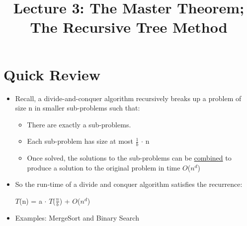 \documentclass[12pt]{article}
\title{\huge Lecture 3: The Master Theorem; The Recursive Tree Method}
\author{}
\date{}
\begin{document}
\maketitle
\section{Quick Review}
\renewcommand{\labelitemii}{$\circ$}
\renewcommand{\labelitemiii}{$\cdot$}
\renewcommand{\labelitemiii}{$\rightarrow$}
\begin{itemize}
\item Recall, a divide-and-conquer algorithm recursively breaks up a problem of size n in smaller sub-problems such that:
	\begin{itemize}
	\item There are exactly a sub-problems.
	\item Each sub-problem has size at most $\frac{1}{b}$ $\cdot$ n
	\item Once solved, the solutions to the sub-problems can be \underline{combined} to produce 	a solution to the original problem in time $O$($n^d$)
	\end{itemize}
\item So the run-time of a divide and conquer algorithm satisfies the recurrence:

\hspace*{\fill}\large{$T$(n) = a $\cdot$ $T$($\frac{n}{b}$) + $O$($n^d$)} \hspace*{\fill} 

\item Examples: MergeSort and Binary Search
\end{itemize}
\end{document}
